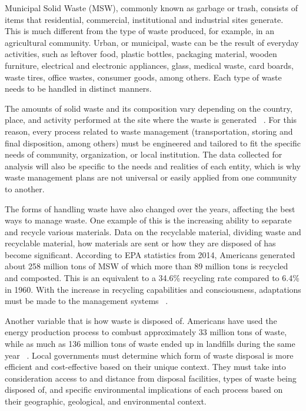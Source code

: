 \documentclass[sigconf]{acmart}
\begin{document}
Municipal Solid Waste (MSW), commonly known as garbage or trash, consists of items that residential, commercial, institutional and industrial sites generate. This is much different from the type of waste produced, for example, in an agricultural community.  Urban, or municipal, waste can be the result of everyday activities, such as leftover food, plastic bottles, packaging material, wooden furniture, electrical and electronic appliances, glass, medical waste, card boards, waste tires, office wastes, consumer goods, among others.  Each type of waste needs to be handled in distinct manners.  

The amounts of solid waste and its composition vary depending on the country, place, and activity performed at the site where the waste is generated ~\cite{chandrappa2012}. For this reason, every process related to waste management (transportation, storing and final disposition, among others) must be engineered and tailored to fit the specific needs of community, organization, or local institution.  The data collected for analysis will also be specific to the needs and realities of each entity, which is why waste management plans are not universal or easily applied from one community to another.  

The forms of handling waste have also changed over the years, affecting the best ways to manage waste.  One example of this is the increasing ability to separate and recycle various materials. Data on the recyclable material, dividing waste and recyclable material,  how materials are sent or how they are disposed of has become significant.  According to EPA statistics from 2014, Americans generated about 258 million tons of MSW of which more than 89 million tons is recycled and composted. This is an equivalent to a 34.6\% recycling rate compared to 6.4\% in 1960. With the increase in recycling capabilities and consciousness, adaptations must be made to the management systems ~\cite{epa2014}.  

Another variable that is how waste is disposed of.  Americans have used the energy production process to combust approximately 33 million tons of waste,  while as much as 136 million tons of waste ended up in landfills during the same year ~\cite{epa2014}.  Local governments must determine which form of waste disposal is more efficient and cost-effective based on their unique context.  They must take into consideration access to and distance from disposal facilities, types of waste being disposed of, and specific environmental implications of each process based on their geographic, geological, and environmental context.  
\end{document}
